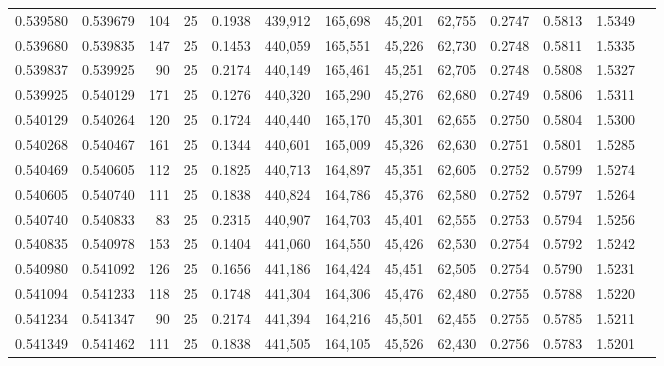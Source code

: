 \begin{tabular}{rrrrrrrrrrrrr}
0.539580 & 0.539679 &   104 &  25 &                                     0.1938 & 439,912 & 165,698 &  45,201 &  62,755 & 0.2747 & 0.5813 & 1.5349 \\
0.539680 & 0.539835 &   147 &  25 &                                     0.1453 & 440,059 & 165,551 &  45,226 &  62,730 & 0.2748 & 0.5811 & 1.5335 \\
0.539837 & 0.539925 &    90 &  25 &                                     0.2174 & 440,149 & 165,461 &  45,251 &  62,705 & 0.2748 & 0.5808 & 1.5327 \\
0.539925 & 0.540129 &   171 &  25 &                                     0.1276 & 440,320 & 165,290 &  45,276 &  62,680 & 0.2749 & 0.5806 & 1.5311 \\
0.540129 & 0.540264 &   120 &  25 &                                     0.1724 & 440,440 & 165,170 &  45,301 &  62,655 & 0.2750 & 0.5804 & 1.5300 \\
0.540268 & 0.540467 &   161 &  25 &                                     0.1344 & 440,601 & 165,009 &  45,326 &  62,630 & 0.2751 & 0.5801 & 1.5285 \\
0.540469 & 0.540605 &   112 &  25 &                                     0.1825 & 440,713 & 164,897 &  45,351 &  62,605 & 0.2752 & 0.5799 & 1.5274 \\
0.540605 & 0.540740 &   111 &  25 &                                     0.1838 & 440,824 & 164,786 &  45,376 &  62,580 & 0.2752 & 0.5797 & 1.5264 \\
0.540740 & 0.540833 &    83 &  25 &                                     0.2315 & 440,907 & 164,703 &  45,401 &  62,555 & 0.2753 & 0.5794 & 1.5256 \\
0.540835 & 0.540978 &   153 &  25 &                                     0.1404 & 441,060 & 164,550 &  45,426 &  62,530 & 0.2754 & 0.5792 & 1.5242 \\
0.540980 & 0.541092 &   126 &  25 &                                     0.1656 & 441,186 & 164,424 &  45,451 &  62,505 & 0.2754 & 0.5790 & 1.5231 \\
0.541094 & 0.541233 &   118 &  25 &                                     0.1748 & 441,304 & 164,306 &  45,476 &  62,480 & 0.2755 & 0.5788 & 1.5220 \\
0.541234 & 0.541347 &    90 &  25 &                                     0.2174 & 441,394 & 164,216 &  45,501 &  62,455 & 0.2755 & 0.5785 & 1.5211 \\
0.541349 & 0.541462 &   111 &  25 &                                     0.1838 & 441,505 & 164,105 &  45,526 &  62,430 & 0.2756 & 0.5783 & 1.5201 \\

\end{tabular}
